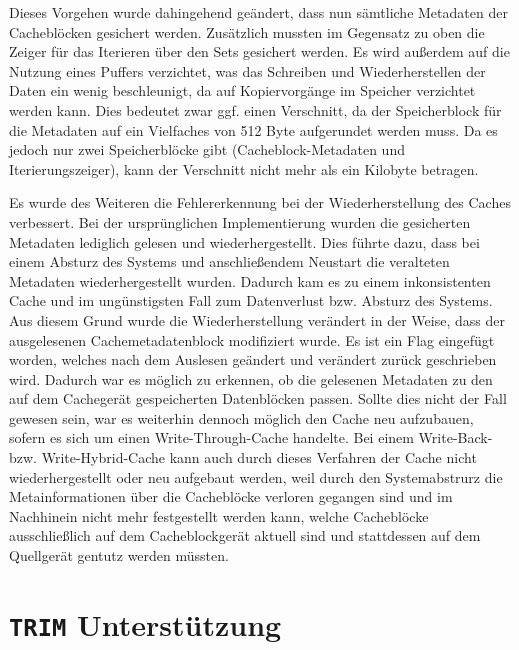 Dieses Vorgehen wurde dahingehend geändert, dass nun sämtliche Metadaten der Cache\-blö\-cken gesichert werden.  Zusätzlich mussten im Gegensatz zu oben die Zeiger
für das Iterieren über den Sets gesichert werden. Es wird außerdem auf die Nutzung eines Puffers verzichtet, was das Schreiben und Wiederherstellen der Daten ein
wenig beschleunigt, da auf Kopiervorgänge im Speicher verzichtet werden kann. Dies bedeutet zwar ggf. einen Verschnitt, da der Speicherblock für die Metadaten
auf ein Vielfaches von 512 Byte aufgerundet werden muss. Da es jedoch nur zwei Speicherblöcke gibt (Cacheblock-Metadaten und Iterierungszeiger), kann der
Verschnitt nicht mehr als ein Kilobyte betragen.

Es wurde des Weiteren die Fehlererkennung bei der Wiederherstellung des Caches verbessert. Bei der ursprünglichen Implementierung wurden die gesicherten
Metadaten lediglich gelesen und wiederhergestellt. Dies führte dazu, dass bei einem Absturz des Systems und anschließendem Neustart die veralteten Metadaten
wiederhergestellt wurden. Dadurch kam es zu einem inkonsistenten Cache und im ungünstigsten Fall zum Datenverlust bzw. Absturz des Systems. Aus diesem Grund
wurde die Wiederherstellung verändert in der Weise, dass der ausgelesenen Cachemetadatenblock modifiziert wurde. Es ist ein Flag eingefügt worden, welches nach dem
Auslesen geändert und verändert zurück geschrieben wird. Dadurch war es möglich zu erkennen, ob die gelesenen Metadaten zu den auf dem Cachegerät gespeicherten
Datenblöcken passen. Sollte dies nicht der Fall gewesen sein, war es weiterhin dennoch möglich den Cache neu aufzubauen, sofern es sich um einen
Write-Through-Cache handelte. Bei einem Write-Back- bzw. Write-Hybrid-Cache kann auch durch dieses Verfahren der Cache nicht wiederhergestellt oder neu aufgebaut
werden, weil durch den Systemabstrurz die Metainformationen über die Cacheblöcke verloren gegangen sind und im Nachhinein nicht mehr festgestellt werden kann,
welche Cacheblöcke ausschließlich auf dem Cacheblockgerät aktuell sind und stattdessen auf dem Quellgerät gentutz werden müssten.

\section{\texttt{TRIM} Unterstützung}
\label{chap6:trim}

